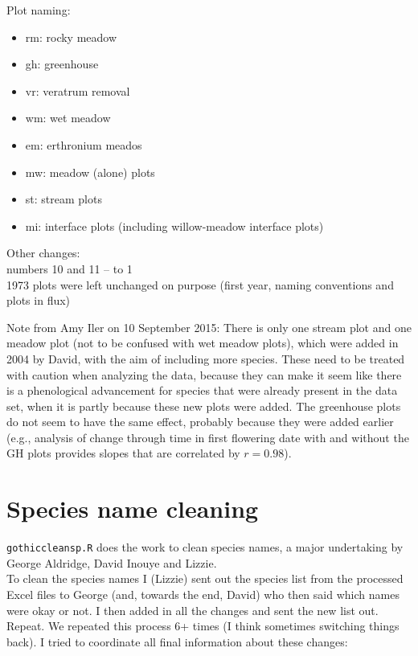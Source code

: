 \documentclass[11pt,a4paper]{article}
\begin{document}
Plot naming:
\begin{itemize}
\item rm: rocky meadow
\item gh: greenhouse
\item vr: veratrum removal
\item wm: wet meadow
\item em: erthronium meados
\item mw: meadow (alone) plots
\item st: stream plots
\item mi: interface plots (including willow-meadow interface plots)
\end{itemize}

Other changes:\\
numbers 10 and 11 -- to 1 \\
1973 plots were left unchanged on purpose (first year, naming
conventions and plots in flux)

Note from Amy Iler on 10 September 2015: There is only one stream plot and one meadow plot (not to be confused with wet meadow plots), which were added in 2004 by David, with the aim of including more species.  These need to be treated with caution when analyzing the data, because they can make it seem like there is a phenological advancement for species that were already present in the data set, when it is partly because these new plots were added.  The greenhouse plots do not seem to have the same effect, probably because they were added earlier (e.g., analysis of change through time in first flowering date with and without the GH plots provides slopes that are correlated by $r = 0.98$). 


\section{Species name cleaning}

\verb|gothiccleansp.R| does the work to clean species names, a major
undertaking by George Aldridge, David Inouye and Lizzie. \\

To clean the species names I (Lizzie) sent out the species list from the processed
Excel files to George (and, towards the end, David) who then said which
names were okay or not. I then added in all the changes and sent the
new list out. Repeat. We repeated this process 6+ times (I think
sometimes switching things back). I tried to coordinate all final
information about these changes:
\end{document}
